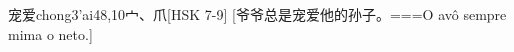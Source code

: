 \begin{EntryWithPhonetic}{宠爱}{chong3'ai4}{8,10}{⼧、⽖}[HSK 7-9]
  [爷爷总是宠爱他的孙子。===O avô sempre mima o neto.]
\end{EntryWithPhonetic}
